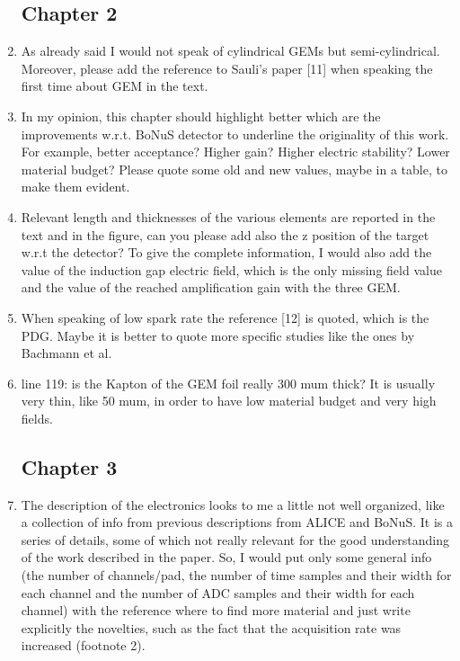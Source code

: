 \documentclass[a4paper,11pt,twoside]{article}
\begin{document}
\begin{enumerate}

\subsection*{Chapter 2}
\item As already said I would not speak of cylindrical GEMs but semi-cylindrical. Moreover, please add the reference to Sauli's paper [11] when speaking the first time about GEM in the text.
\textcolor{blue}{ } 

\item In my opinion, this chapter should highlight better which are the improvements w.r.t. BoNuS detector to underline the originality of this work. For example, better acceptance? Higher gain? Higher electric stability? Lower material budget? Please quote some old and new values, maybe in a table, to make them evident.
\textcolor{blue}{ } 

\item Relevant length and thicknesses of the various elements are reported in the text and in the figure, can you please add also the z position of the target w.r.t the detector? To give the complete information, I would also add the value of the induction gap electric field, which is the only missing field value and the value of the reached amplification gain with the three GEM.
\textcolor{blue}{ } 

\item When speaking of low spark rate the reference [12] is quoted, which is the PDG. Maybe it is better to quote more specific studies like the ones by Bachmann et al.
\textcolor{blue}{ } 

\item line 119: is the Kapton of the GEM foil really 300 mum thick? It is usually very thin, like 50 mum, in order to have low material budget and very high fields.
\textcolor{blue}{ } 

\subsection*{ Chapter 3}
\item The description of the electronics looks to me a little not well organized, like a collection of info from previous descriptions from ALICE and BoNuS. It is a series of details, some of which not really relevant for the good understanding of the work described in the paper. So, I would put only some general info (the number of channels/pad, the number of time samples and their width for each channel and the number of  ADC samples and their width for each channel) with the reference where to find more material and just write explicitly the novelties, such as the fact that the acquisition rate was increased (footnote 2).
\textcolor{blue}{ } 


\end{enumerate}
\end{document}
